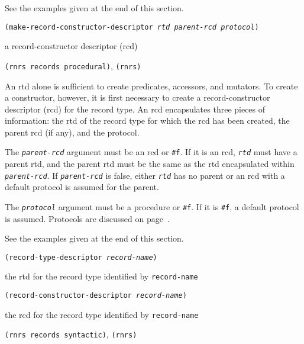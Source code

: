 See the examples given at the end of this section.


\begin{description}

\label{records_s24}\item[procedure] \texttt{(make-record-constructor-descriptor \textit{rtd} \textit{parent-rcd} \textit{protocol})}



\item[returns] a record-constructor descriptor (rcd)


\item[libraries] \texttt{(rnrs records procedural)}, \texttt{(rnrs)}
\end{description}


\label{records_s25}\label{records_s26}\label{records_s27}An rtd alone is sufficient to create predicates, accessors, and mutators.
To create a constructor, however, it is first necessary to create a record-constructor
descriptor (rcd) for the record type.
An rcd encapsulates three pieces of information: the rtd of the record type
for which the rcd has been created, the parent rcd (if any), and the
protocol.


The \texttt{\textit{parent-rcd}} argument must be an rcd or \texttt{\#{}f}.
If it is an rcd, \texttt{\textit{rtd}} must have a parent rtd, and the parent rtd must be
the same as the rtd encapsulated within \texttt{\textit{parent-rcd}}.
If \texttt{\textit{parent-rcd}} is false, either \texttt{\textit{rtd}} has no parent or an rcd with a default
protocol is assumed for the parent.


The \texttt{\textit{protocol}} argument must be a procedure or \texttt{\#{}f}.
If it is \texttt{\#{}f}, a default protocol is assumed.
Protocols are discussed on page \pageref{records_page_protocols}.


See the examples given at the end of this section.


\begin{description}

\label{records_s28}\item[syntax] \texttt{(record-type-descriptor \textit{record-name})}



\item[returns] the rtd for the record type identified by \texttt{record-name}


\item[syntax] \texttt{(record-constructor-descriptor \textit{record-name})}



\item[returns] the rcd for the record type identified by \texttt{record-name}


\item[libraries] \texttt{(rnrs records syntactic)}, \texttt{(rnrs)}
\end{description}


